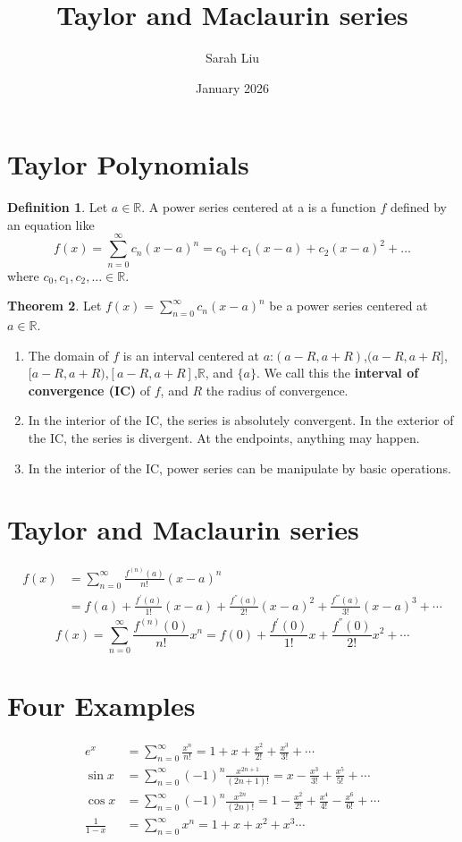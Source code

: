\documentclass{article}
\title{Taylor and Maclaurin series}
\author{Sarah Liu}
\date{January 2026}
\theoremstyle{definition}
\newtheorem{theorem}{Theorem}[section]
\newtheorem{definition}[theorem]{Definition}
\theoremstyle{remark}
\begin{document}
\maketitle

\section{Taylor Polynomials}
\begin{definition}
    Let $a\in \mathbb{R}$. A power series centered at a is a function $f$ defined by an equation like 
    \[
    f(x)=\sum_{n=0}^{\infty}c_n(x-a)^n=c_0+c_1(x-a)+c_2(x-a)^2+\dots
    \]
    where $c_0,c_1,c_2,\dots\in\mathbb{R}$.
\end{definition}

\begin{theorem}
    Let $f(x)=\sum_{n=0}^{\infty}c_n(x-a)^n$ be a power series centered at $a\in\mathbb{R}$.
    \begin{enumerate}
        \item The domain of $f$ is an interval centered at $a$:$(a-R,a+R)$,$(a-R,a+R]$,$[a-R,a+R)$,$[a-R,a+R]$,$\mathbb{R}$, and $\{a\}$. We call this the \textbf{interval of convergence (IC)} of $f$, and $R$ the radius of convergence.
        \item In the interior of the IC, the series is absolutely convergent. In the exterior of the IC, the series is divergent. At the endpoints, anything may happen.
        \item In the interior of the IC, power series can be manipulate by basic operations.
    \end{enumerate}
\end{theorem}

\section{Taylor and Maclaurin series}
\[
\begin{aligned}
    f(x)&=\sum_{n=0}^{\infty}\frac{f^{(n)}(a)}{n!}(x-a)^n\\
    &=f(a)+\frac{f^{'}(a)}{1!}(x-a)+\frac{f^{''}(a)}{2!}(x-a)^2+\frac{f^{'''}(a)}{3!}(x-a)^3+\cdots
\end{aligned}
\]
\[
    f(x)=\sum_{n=0}^{\infty}\frac{f^{(n)}(0)}{n!}x^n=f(0)+\frac{f^{'}(0)}{1!}x+\frac{f^{''}(0)}{2!}x^2+\cdots
\]

\section{Four Examples}
\[
\begin{aligned}
e^x&=\sum_{n=0}^{\infty}\frac{x^n}{n!}=1+x+\frac{x^2}{2!}+\frac{x^3}{3!}+\cdots\\
\sin x&=\sum_{n=0}^{\infty}(-1)^n\frac{x^{2n+1}}{(2n+1)!}=x-\frac{x^3}{3!}+\frac{x^5}{5!}+\cdots\\
\cos x&=\sum_{n=0}^{\infty}(-1)^n\frac{x^{2n}}{(2n)!}=1-\frac{x^2}{2!}+\frac{x^4}{4!}-\frac{x^6}{6!}+\cdots\\
\frac{1}{1-x}&=\sum_{n=0}^{\infty}x^n=1+x+x^2+x^3\cdots
\end{aligned}
\]
\end{document}
